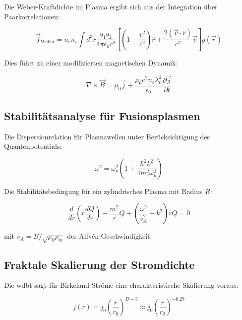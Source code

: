 Die Weber-Kraftdichte im Plasma ergibt sich aus der Integration über Paarkorrelationen:

\begin{equation}
\vec{f}_{\text{Weber}} = n_e n_i \int d^3r \frac{q_1 q_2}{4\pi\epsilon_0 r^2} \left[ \left(1-\frac{v^2}{c^2}\right)\hat{r} + \frac{2(\vec{v}\cdot\hat{r})}{c^2}\vec{v} \right] g(\vec{r})
\end{equation}

Dies führt zu einer modifizierten magnetischen Dynamik:

\begin{equation}
\label{eq:modified_ampere}
\nabla \times \vec{B} = \mu_0 \vec{j} + \frac{\mu_0 e^2 n_e \lambda_c^2}{\epsilon_0} \frac{\partial \vec{j}}{\partial t}
\end{equation}

\subsection{Stabilitätsanalyse für Fusionsplasmen}

Die Dispersionrelation für Plasmawellen unter Berücksichtigung des Quantenpotentials:

\begin{equation}
\label{eq:dispersion}
\omega^2 = \omega_p^2 \left(1 + \frac{\hbar^2 k^2}{4m_e^2 \omega_p^2}\right)
\end{equation}

Die Stabilitätsbedingung für ein zylindrisches Plasma mit Radius $R$:

\begin{equation}
\label{eq:stability}
\frac{d}{dr}\left(r\frac{dQ}{dr}\right) - \frac{m^2}{r}Q + \left(\frac{\omega^2}{v_A^2} - k^2\right)rQ = 0
\end{equation}

mit $v_A = B/\sqrt{\mu_0 \rho_m}$ der Alfvén-Geschwindigkeit.

\subsection{Fraktale Skalierung der Stromdichte}

Die \gls{wdbt} sagt für Birkeland-Ströme eine charakteristische Skalierung voraus:

\begin{equation}
j(r) = j_0 \left(\frac{r}{r_0}\right)^{D-3} \approx j_0 \left(\frac{r}{r_0}\right)^{-0.29}
\end{equation}

